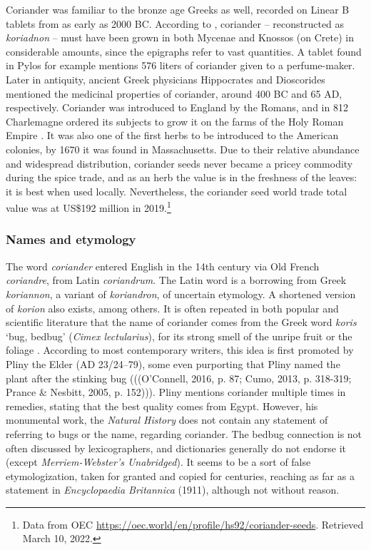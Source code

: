 \documentclass[12pt]{article}
\begin{document}
\noindent Coriander was familiar to the bronze age Greeks as well, recorded on Linear B tablets from as early as 2000 BC. According to \textcite{chadwick_mycenaean_1976}, coriander -- reconstructed as \textit{koriadnon} -- must have been grown in both Mycenae and Knossos (on Crete) in considerable amounts, since the epigraphs refer to vast quantities. A tablet found in Pylos for example mentions 576 liters of coriander given to a perfume-maker. Later in antiquity, ancient Greek physicians Hippocrates and Dioscorides mentioned the medicinal properties of coriander, around 400 BC and 65 AD, respectively. Coriander was introduced to England by the Romans, and in 812 Charlemagne ordered its subjects to grow it on the farms of the Holy Roman Empire \parencite{prance_cultural_2005}. It was also one of the first herbs to be introduced to the American colonies, by 1670 it was found in Massachusetts. Due to their relative abundance and widespread distribution, coriander seeds never became a pricey commodity during the spice trade, and as an herb the value is in the freshness of the leaves: it is best when used locally. Nevertheless, the coriander seed world trade total value was at US\$192 million in 2019.\footnote{Data from OEC \url{https://oec.world/en/profile/hs92/coriander-seeds}. Retrieved March 10, 2022.}

\subsubsection{Names and etymology}

The word \textit{coriander} entered English in the 14th century via Old French \textit{coriandre}, from Latin \textit{coriandrum}. The Latin word is a borrowing from Greek \textit{koriannon}, a variant of \textit{koriandron}, of uncertain etymology. A shortened version of \textit{korion} also exists, among others. It is often repeated in both popular and scientific literature that the name of coriander comes from the Greek word \textit{koris} `bug, bedbug' (\textit{Cimex lectularius}), for its strong smell of the unripe fruit or the foliage \parencite[cf.][]{harper_coriander_nodate}. According to most contemporary writers, this idea is first promoted by Pliny the Elder (AD 23/24–79), some even purporting that Pliny named the plant after the stinking bug \parencite{oconnell_book_2016, cumo_encyclopedia_2013, prance_cultural_2005} (((O’Connell, 2016, p. 87; Cumo, 2013, p. 318-319; Prance \& Nesbitt, 2005, p. 152))). Pliny mentions coriander multiple times in remedies, stating that the best quality comes from Egypt. However, his monumental work, the \textit{Natural History} \parencite{pliny_the_elder_natural_1855} does not contain any statement of referring to bugs or the name, regarding coriander. The bedbug connection is not often discussed by lexicographers, and dictionaries generally do not endorse it (except \textit{Merriem-Webster’s Unabridged}). It seems to be a sort of false etymologization, taken for granted and copied for centuries, reaching as far as a statement in \textit{Encyclopaedia Britannica} (1911), although not without reason.
\end{document}

